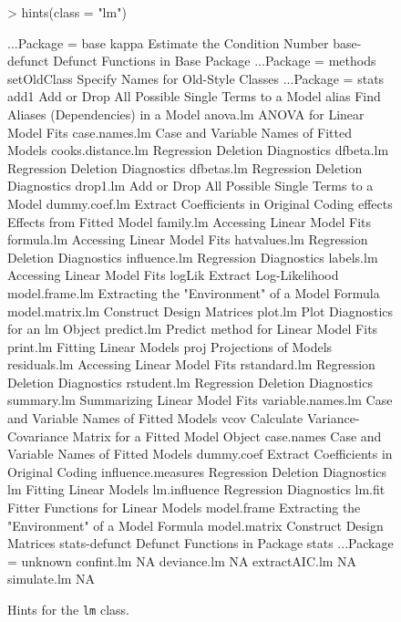 \documentclass{report}
\begin{document}
\begin{article}
\begin{figure*}[hbt]
\begin{Schunk}
\begin{Sinput}
> hints(class = "lm")
\end{Sinput}
\begin{Soutput}
...Package = base
kappa                         Estimate the Condition Number
base-defunct                  Defunct Functions in Base Package
...Package = methods
setOldClass                   Specify Names for Old-Style Classes
...Package = stats
add1                          Add or Drop All Possible Single Terms to a Model
alias                         Find Aliases (Dependencies) in a Model
anova.lm                      ANOVA for Linear Model Fits
case.names.lm                 Case and Variable Names of Fitted Models
cooks.distance.lm             Regression Deletion Diagnostics
dfbeta.lm                     Regression Deletion Diagnostics
dfbetas.lm                    Regression Deletion Diagnostics
drop1.lm                      Add or Drop All Possible Single Terms to a Model
dummy.coef.lm                 Extract Coefficients in Original Coding
effects                       Effects from Fitted Model
family.lm                     Accessing Linear Model Fits
formula.lm                    Accessing Linear Model Fits
hatvalues.lm                  Regression Deletion Diagnostics
influence.lm                  Regression Diagnostics
labels.lm                     Accessing Linear Model Fits
logLik                        Extract Log-Likelihood
model.frame.lm                Extracting the "Environment" of a Model Formula
model.matrix.lm               Construct Design Matrices
plot.lm                       Plot Diagnostics for an lm Object
predict.lm                    Predict method for Linear Model Fits
print.lm                      Fitting Linear Models
proj                          Projections of Models
residuals.lm                  Accessing Linear Model Fits
rstandard.lm                  Regression Deletion Diagnostics
rstudent.lm                   Regression Deletion Diagnostics
summary.lm                    Summarizing Linear Model Fits
variable.names.lm             Case and Variable Names of Fitted Models
vcov                          Calculate Variance-Covariance Matrix for a Fitted Model
                              Object
case.names                    Case and Variable Names of Fitted Models
dummy.coef                    Extract Coefficients in Original Coding
influence.measures            Regression Deletion Diagnostics
lm                            Fitting Linear Models
lm.influence                  Regression Diagnostics
lm.fit                        Fitter Functions for Linear Models
model.frame                   Extracting the "Environment" of a Model Formula
model.matrix                  Construct Design Matrices
stats-defunct                 Defunct Functions in Package stats
...Package = unknown
confint.lm                    NA
deviance.lm                   NA
extractAIC.lm                 NA
simulate.lm                   NA
\end{Soutput}
\end{Schunk}
\caption{\label{fig1} Hints for the {\tt lm} class.}
\end{figure*}


\end{article}
\end{document}
